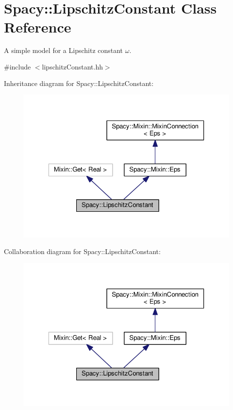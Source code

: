 \hypertarget{classSpacy_1_1LipschitzConstant}{\section{Spacy\-:\-:Lipschitz\-Constant Class Reference}
\label{classSpacy_1_1LipschitzConstant}
}


A simple model for a Lipschitz constant $\omega$.  




{\ttfamily \#include $<$lipschitz\-Constant.\-hh$>$}



Inheritance diagram for Spacy\-:\-:Lipschitz\-Constant\-:
\nopagebreak
\begin{figure}[H]
\begin{center}
\leavevmode
\includegraphics[width=323pt]{classSpacy_1_1LipschitzConstant__inherit__graph}
\end{center}
\end{figure}


Collaboration diagram for Spacy\-:\-:Lipschitz\-Constant\-:
\nopagebreak
\begin{figure}[H]
\begin{center}
\leavevmode
\includegraphics[width=323pt]{classSpacy_1_1LipschitzConstant__coll__graph}
\end{center}
\end{figure}
